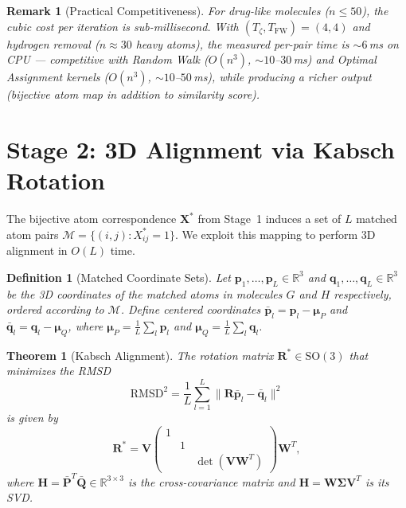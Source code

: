 \documentclass[conference]{IEEEtran}
\newtheorem{theorem}{Theorem}
\newtheorem{remark}{Remark}
\newtheorem{definition}{Definition}
\begin{document}
\begin{remark}[Practical Competitiveness]
For drug-like molecules ($n \!\leq\! 50$),
the cubic cost per iteration is sub-millisecond.
With $(T_\zeta, T_{\mathrm{FW}}) = (4, 4)$ and hydrogen
removal ($n \!\approx\! 30$ heavy atoms), the measured
per-pair time is ${\sim}6$\,ms on CPU ---
competitive with Random Walk ($O(n^3)$, ${\sim}10$--$30$\,ms)
and Optimal Assignment kernels ($O(n^3)$, ${\sim}10$--$50$\,ms),
while producing a richer output (bijective atom map
in addition to similarity score).
\end{remark}


\section{Stage 2: 3D Alignment via Kabsch Rotation}
\label{sec:3d-alignment}

The bijective atom correspondence $\mathbf{X}^*$ from Stage~1
induces a set of $L$ matched atom pairs
$\mathcal{M} = \{(i,j) : X^*_{ij} = 1\}$.
We exploit this mapping to perform 3D alignment in $O(L)$ time.

\begin{definition}[Matched Coordinate Sets]
\label{def:matched-coords}
Let $\mathbf{p}_1, \ldots, \mathbf{p}_L \in \mathbb{R}^3$
and $\mathbf{q}_1, \ldots, \mathbf{q}_L \in \mathbb{R}^3$
be the 3D coordinates of the matched atoms in molecules
$G$ and $H$ respectively, ordered according to $\mathcal{M}$.
Define centered coordinates
$\bar{\mathbf{p}}_l = \mathbf{p}_l - \boldsymbol{\mu}_P$ and
$\bar{\mathbf{q}}_l = \mathbf{q}_l - \boldsymbol{\mu}_Q$,
where $\boldsymbol{\mu}_P = \frac{1}{L}\sum_l \mathbf{p}_l$
and $\boldsymbol{\mu}_Q = \frac{1}{L}\sum_l \mathbf{q}_l$.
\end{definition}

\begin{theorem}[Kabsch Alignment]
\label{thm:kabsch}
The rotation matrix $\mathbf{R}^* \in \mathrm{SO}(3)$ that
minimizes the RMSD
\begin{equation}
\mathrm{RMSD}^2 = \frac{1}{L}
  \sum_{l=1}^{L} \|\mathbf{R}\bar{\mathbf{p}}_l - \bar{\mathbf{q}}_l\|^2
\label{eq:rmsd}
\end{equation}
is given by
\begin{equation}
\mathbf{R}^* = \mathbf{V}
  \begin{pmatrix} 1 & & \\ & 1 & \\ & & \det(\mathbf{V}\mathbf{W}^T) \end{pmatrix}
  \mathbf{W}^T,
\label{eq:kabsch-rotation}
\end{equation}
where $\mathbf{H} = \bar{\mathbf{P}}^T \bar{\mathbf{Q}} \in \mathbb{R}^{3 \times 3}$
is the cross-covariance matrix and $\mathbf{H} = \mathbf{W}\boldsymbol{\Sigma}\mathbf{V}^T$
is its SVD.
\end{theorem}
\end{document}
